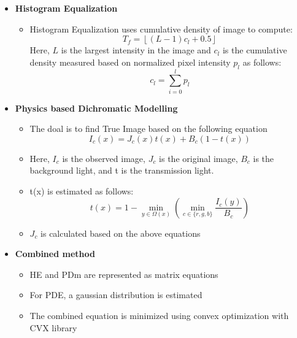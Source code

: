 \begin{itemize}
      \item \textbf{Histogram Equalization}
            \begin{itemize}
                  \item Histogram Equalization uses cumulative density of image to compute:
                  \[
                    T_f = \left\lfloor (L - 1)c_l + 0.5 \right\rfloor
                  \]
                Here, $L$ is the largest intensity in the image and $c_l$ is the cumulative density measured based on normalized pixel intensity $p_l$ as follows:
                  \[
                    c_l = \sum_{i=0}^{l} p_l
                  \]
            \end{itemize}

      \item \textbf{Physics based Dichromatic Modelling}
            \begin{itemize}
                  \item The doal is to find True Image based on the following equation
                  \[
                    I_c(x) = J_c(x)t(x) + B_c(1-t(x))
                  \]
                  \item Here, $I_c$ is the observed image, $J_c$ is the original image, $B_c$ is the background light, and t is the transmission light.
                  \item t(x) is estimated as follows:
                  \[
                    t(x) = 1 - \min_{y \in \Omega(x)} \left( \min_{c \in \{r,g,b\}} \frac{I_c(y)}{B_c} \right)
                  \]
                  \item $J_c$ is calculated based on the above equations
            \end{itemize}

      \item \textbf{Combined method}
            \begin{itemize}
                  \item HE and PDm are represented as matrix equations
                  \item For PDE, a gaussian distribution is estimated
                  \item The combined equation is minimized using convex optimization with CVX library
            \end{itemize}
\end{itemize}


